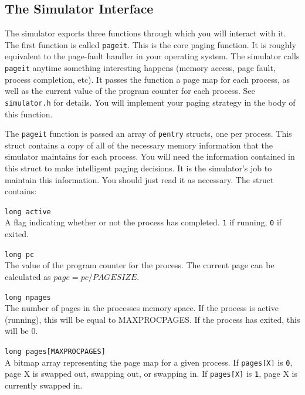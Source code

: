 \documentclass[12pt]{article}
\newenvironment{packed_desc}{
\begin{description}
  \setlength{\itemsep}{1pt}
  \setlength{\parskip}{0pt}
  \setlength{\parsep}{0pt}
}{\end{description}}
\begin{document}
\subsection {The Simulator Interface}

The simulator exports three functions through which you will interact
with it. The first function is called \texttt{pageit}. This is the
core paging function. It is roughly equivalent to the page-fault handler in
your operating system. The simulator calls \texttt{pageit} anytime
something interesting happens (memory access, page fault, process
completion, etc). It passes the function a page map for each process,
as well as the current value of the program counter for each
process. See \texttt{simulator.h} for details. You will
implement your paging strategy in the body of this function.

The \texttt{pageit} function is passed an array of \texttt{pentry}
structs, one per process. This struct contains a copy of all of the
necessary memory information that the simulator maintains for each
process. You will need the information contained in this struct to make
intelligent paging decisions. It is the simulator's job to maintain
this information. You should just read it as necessary. The struct
contains:

\begin{packed_desc}
\item[\texttt{long active}] \hfill \\
  A flag indicating whether or not the
  process has completed. \texttt{1} if running, \texttt{0} if exited.
\item[\texttt{long pc}] \hfill \\
  The value of the program counter for the
  process. The current page can be calculated as $page = pc / PAGESIZE$.
\item[\texttt{long npages}] \hfill \\
  The number of pages in the processes
  memory space. If the process is active (running), this will be equal
  to MAXPROCPAGES. If the process has exited, this will be 0.
\item[\texttt{long pages[MAXPROCPAGES]}] \hfill \\
  A bitmap array representing the
  page map for a given process. If \texttt{pages[X]} is
  \texttt{0}, page X is swapped out, swapping out, or swapping in.
  If \texttt{pages[X]} is \texttt{1}, page X is currently swapped in.
\end{packed_desc}
\end{document}
